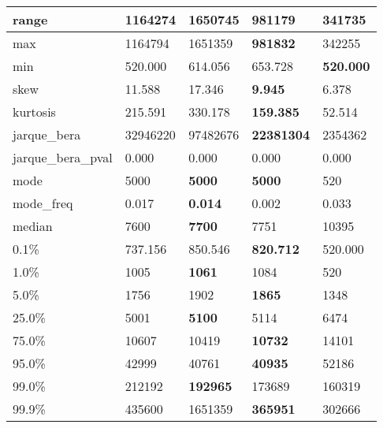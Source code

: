 \begin{table}[H]
\begin{tabular}{|l|m{10em}|m{10em}|m{10em}|m{10em}|}
\hline range & 1164274 & 1650745 & \bfseries 981179 & \cellcolor[rgb]{0.9, 0.54, 0.52} 341735 \\
\hline max & 1164794 & 1651359 & \bfseries 981832 & \cellcolor[rgb]{0.9, 0.54, 0.52} 342255 \\
\hline min & 520.000 & 614.056 & \cellcolor[rgb]{0.9, 0.54, 0.52} 653.728 & \bfseries 520.000 \\
\hline skew & 11.588 & \cellcolor[rgb]{0.9, 0.54, 0.52} 17.346 & \bfseries 9.945 & 6.378 \\
\hline kurtosis & 215.591 & 330.178 & \bfseries 159.385 & \cellcolor[rgb]{0.9, 0.54, 0.52} 52.514 \\
\hline jarque\_bera & 32946220 & \cellcolor[rgb]{0.9, 0.54, 0.52} 97482676 & \bfseries 22381304 & 2354362 \\
\hline jarque\_bera\_pval & 0.000 & 0.000 & 0.000 & 0.000 \\
\hline mode & 5000 & \bfseries 5000 & \bfseries 5000 & \cellcolor[rgb]{0.9, 0.54, 0.52} 520 \\
\hline mode\_freq & 0.017 & \bfseries 0.014 & 0.002 & \cellcolor[rgb]{0.9, 0.54, 0.52} 0.033 \\
\hline median & 7600 & \bfseries 7700 & 7751 & \cellcolor[rgb]{0.9, 0.54, 0.52} 10395 \\
\hline 0.1\% & 737.156 & 850.546 & \bfseries 820.712 & \cellcolor[rgb]{0.9, 0.54, 0.52} 520.000 \\
\hline 1.0\% & 1005 & \bfseries 1061 & 1084 & \cellcolor[rgb]{0.9, 0.54, 0.52} 520 \\
\hline 5.0\% & 1756 & 1902 & \bfseries 1865 & \cellcolor[rgb]{0.9, 0.54, 0.52} 1348 \\
\hline 25.0\% & 5001 & \bfseries 5100 & 5114 & \cellcolor[rgb]{0.9, 0.54, 0.52} 6474 \\
\hline 75.0\% & 10607 & 10419 & \bfseries 10732 & \cellcolor[rgb]{0.9, 0.54, 0.52} 14101 \\
\hline 95.0\% & 42999 & 40761 & \bfseries 40935 & \cellcolor[rgb]{0.9, 0.54, 0.52} 52186 \\
\hline 99.0\% & 212192 & \bfseries 192965 & 173689 & \cellcolor[rgb]{0.9, 0.54, 0.52} 160319 \\
\hline 99.9\% & 435600 & \cellcolor[rgb]{0.9, 0.54, 0.52} 1651359 & \bfseries 365951 & 302666 \\
\hline
\end{tabular}
\end{table}
